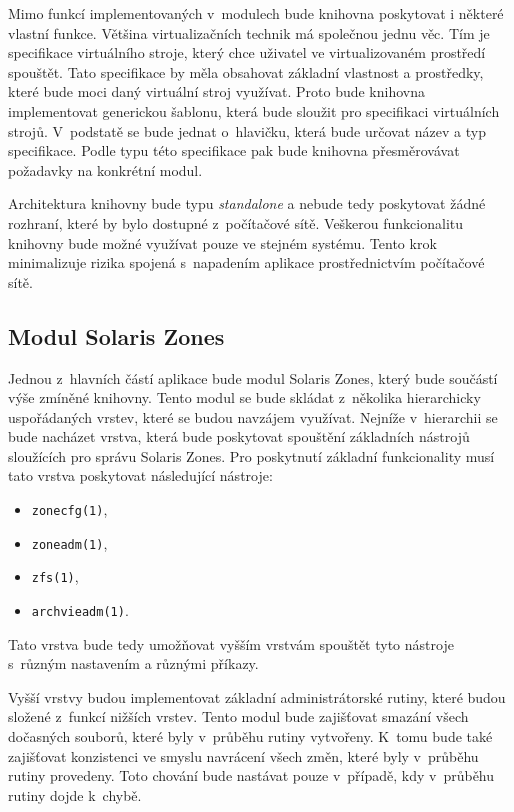 Mimo funkcí implementovaných v~modulech bude knihovna poskytovat i některé vlastní funkce. Většina virtualizačních technik
má společnou jednu věc. Tím je specifikace virtuálního stroje, který chce uživatel ve virtualizovaném prostředí spouštět. Tato specifikace
by měla obsahovat základní vlastnost a prostředky, které bude moci daný virtuální stroj využívat. Proto bude knihovna implementovat
generickou šablonu, která bude sloužit pro specifikaci virtuálních strojů. V~podstatě se bude jednat o~hlavičku, která bude určovat
název a typ specifikace. Podle typu této specifikace pak bude knihovna přesměrovávat požadavky na konkrétní modul.

Architektura knihovny bude typu \textit{standalone} a nebude tedy poskytovat žádné rozhraní, které by bylo dostupné z~počítačové
sítě. Veškerou funkcionalitu knihovny bude možné využívat pouze ve stejném systému. Tento krok minimalizuje rizika spojená
s~napadením aplikace prostřednictvím počítačové sítě.
\subsection{Modul Solaris Zones}
\label{chapter:design:architecture:szones}
Jednou z~hlavních částí aplikace bude modul Solaris Zones, který bude součástí výše zmíněné knihovny. Tento modul se bude skládat
z~několika hierarchicky uspořádaných vrstev, které se budou navzájem využívat. Nejníže v~hierarchii se bude nacházet vrstva,
která bude poskytovat spouštění základních nástrojů sloužících pro správu Solaris Zones. Pro poskytnutí základní funkcionality
musí tato vrstva poskytovat následující nástroje:
\begin{itemize}
 \item \verb|zonecfg(1)|,
 \item \verb|zoneadm(1)|,
 \item \verb|zfs(1)|,
 \item \verb|archvieadm(1)|.
\end{itemize}
Tato vrstva bude tedy umožňovat vyšším vrstvám spouštět tyto nástroje s~různým nastavením a různými příkazy.

Vyšší vrstvy budou implementovat základní administrátorské rutiny, které budou složené z~funkcí nižších vrstev. Tento modul
bude zajišťovat smazání všech dočasných souborů, které byly v~průběhu rutiny vytvořeny. K~tomu bude také
zajišťovat konzistenci ve smyslu navrácení všech změn, které byly v~průběhu rutiny provedeny. Toto chování bude nastávat
pouze v~případě, kdy v~průběhu rutiny dojde k~chybě.

